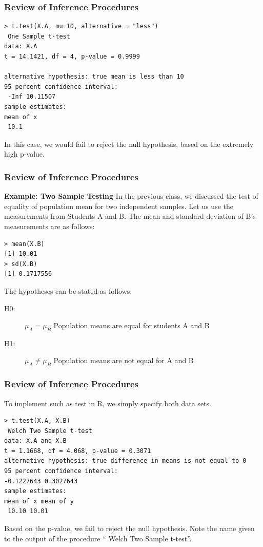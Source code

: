 \documentclass{beamer}
\begin{document}
\begin{frame}[fragile]
	\frametitle{Review of Inference Procedures}
	\large
\begin{verbatim}
> t.test(X.A, mu=10, alternative = "less")
 One Sample t-test
data: X.A
t = 14.1421, df = 4, p-value = 0.9999

alternative hypothesis: true mean is less than 10
95 percent confidence interval:
 -Inf 10.11507
sample estimates:
mean of x
 10.1
 \end{verbatim}
 
In this case, we would fail to reject the null hypothesis, based on
the extremely high p-value.
\end{frame}
\begin{frame}[fragile]
	\frametitle{Review of Inference Procedures}
	\large

\noindent \textbf{Example: Two Sample Testing}
In the previous class, we discussed the test of equality of population
mean for two independent samples.
Let us use the measurements from Students A and B. The mean
and standard deviation of B’s measurements are as follows:
\begin{framed}
\begin{verbatim}
> mean(X.B)
[1] 10.01
> sd(X.B)
[1] 0.1717556
\end{verbatim}
\end{framed}
The hypotheses can be stated as follows:
\begin{description}
	\item[H0:] $\mu_A =\mu_B $ Population means are equal for students A and B
	\item[H1:] $\mu_A \neq \mu_B $ Population means are not equal for A and B
\end{description}
 
\end{frame}
\begin{frame}[fragile]
	\frametitle{Review of Inference Procedures}
	\large
	To implement such as test in R, we simply specify both data sets.
\begin{framed}
\begin{verbatim}
> t.test(X.A, X.B)
 Welch Two Sample t-test
data: X.A and X.B
t = 1.1668, df = 4.068, p-value = 0.3071
alternative hypothesis: true difference in means is not equal to 0
95 percent confidence interval:
-0.1227643 0.3027643
sample estimates:
mean of x mean of y
 10.10 10.01
 \end{verbatim}
 \end{framed}
Based on the p-value, we fail to reject the null hypothesis.
Note the name given to the output of the procedure “ Welch Two
Sample t-test”.

\end{frame}
\end{document}
